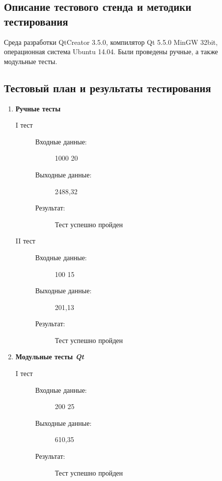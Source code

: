 \documentclass[12pt,a4paper]{report}
\begin{document}
\subsection{Описание тестового стенда и методики тестирования}
\hspace{\parindent}
Среда разработки QtCreator 3.5.0, компилятор Qt 5.5.0 MinGW 32bit, операционная система Ubuntu 14.04. Были проведены ручные, а также модульные тесты.

\subsection{Тестовый план и результаты тестирования}
\begin{enumerate}
\item \textbf{Ручные тесты}
\begin{description}
\item[I тест]
\hspace{\parindent}
\begin{flushleft}
\begin{description}
\item[Входные данные:] 1000 20
\item[Выходные данные:] 2488,32
\item[Результат:] Тест успешно пройден
\end{description}
\end{flushleft}
\end{description}

\begin{description}
\item[II тест]
\hspace{\parindent}
\begin{flushleft}
\begin{description}
\item[Входные данные:] 100 15
\item[Выходные данные:] 201,13
\item[Результат:] Тест успешно пройден
\end{description}
\end{flushleft}
\end{description}

\item \textbf{Модульные тесты \textit{Qt}}
\begin{description}
\item[I тест]
\hspace{\parindent}
\begin{flushleft}
\begin{description}
\item[Входные данные:] 200 25
\item[Выходные данные:] 610,35
\item[Результат:] Тест успешно пройден
\end{description}
\end{flushleft}
\end{description}


\end{enumerate}
\end{document}
